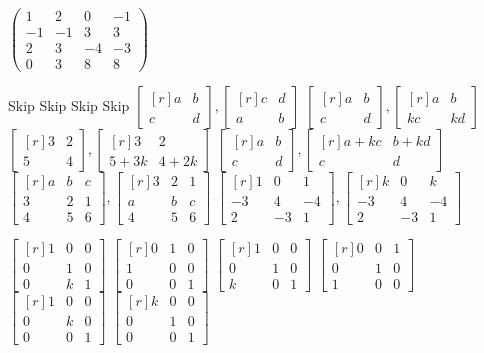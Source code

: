 \documentclass[11pt,answers]{exam} %
\newcommand{\mat}[1]{\begin{bmatrix*}[r] #1 \end{bmatrix*}}
\begin{document}
\begin{questions}
    $\left(\begin{array}{rrrr}
1 & 2 & 0 & -1 \\
-1 & -1 & 3 & 3 \\
2 & 3 & -4 & -3 \\
0 & 3 & 8 & 8
\end{array}\right)$


\pagebreak

    

    \question Skip
    \question Skip
    \question Skip
    \question Skip
    \question $\mat{a & b \\ c & d}, \mat{c & d \\ a & b}$
    \question $\mat{a & b \\ c & d}, \mat{a & b \\ kc & kd}$
    \question $\mat{3 & 2 \\ 5 & 4}, \mat{3 & 2 \\ 5+3k & 4 + 2k}$
    \question $\mat{a & b \\ c & d}, \mat{a+kc & b+kd \\ c & d}$
    \question $\mat{a & b & c \\ 3 & 2 & 1 \\ 4 & 5 & 6}, \mat{3 & 2 & 1 \\ a & b & c \\ 4 & 5 & 6}$
    \question $\mat{1 & 0 & 1 \\ -3 & 4 & -4 \\ 2 & -3 & 1}, \mat{k & 0 & k \\ -3 & 4 & -4 \\ 2 & -3 & 1}$

    \question $\mat{1 & 0 & 0 \\ 0 & 1 & 0 \\ 0 & k & 1}$
    \question $\mat{0 & 1 & 0 \\ 1 & 0 & 0 \\ 0 & 0 & 1}$
    \question $\mat{1 & 0 & 0 \\ 0 & 1 & 0 \\ k & 0 & 1}$
    \question $\mat{0 & 0 & 1 \\ 0 & 1 & 0 \\ 1 & 0 & 0}$
    \question $\mat{1 & 0 & 0 \\ 0 & k & 0 \\ 0 & 0 & 1}$
    \question $\mat{k& 0 & 0 \\ 0 & 1 & 0 \\ 0 & 0 & 1}$


\end{questions}
\end{document}
